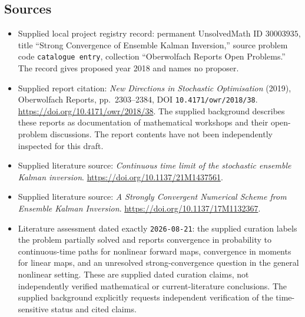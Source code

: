 \documentclass[11pt]{article}
\begin{document}
\subsection{Sources}
\begin{itemize}
\item Supplied local project registry record: permanent UnsolvedMath ID \(30003935\), title ``Strong Convergence of Ensemble Kalman Inversion,'' source problem code \texttt{catalogue entry}, collection ``Oberwolfach Reports Open Problems.'' The record gives proposed year 2018 and names no proposer.
\item Supplied report citation: \emph{New Directions in Stochastic Optimisation} (2019), Oberwolfach Reports, pp.\ 2303--2384, DOI \texttt{10.4171/owr/2018/38}. \url{https://doi.org/10.4171/owr/2018/38}. The supplied background describes these reports as documentation of mathematical workshops and their open-problem discussions. The report contents have not been independently inspected for this draft.
\item Supplied literature source: \emph{Continuous time limit of the stochastic ensemble Kalman inversion}. \url{https://doi.org/10.1137/21M1437561}.
\item Supplied literature source: \emph{A Strongly Convergent Numerical Scheme from Ensemble Kalman Inversion}. \url{https://doi.org/10.1137/17M1132367}.
\item Literature assessment dated exactly \texttt{2026-08-21}: the supplied curation labels the problem partially solved and reports convergence in probability to continuous-time paths for nonlinear forward maps, convergence in moments for linear maps, and an unresolved strong-convergence question in the general nonlinear setting. These are supplied dated curation claims, not independently verified mathematical or current-literature conclusions. The supplied background explicitly requests independent verification of the time-sensitive status and cited claims.
\end{itemize}
\end{document}

